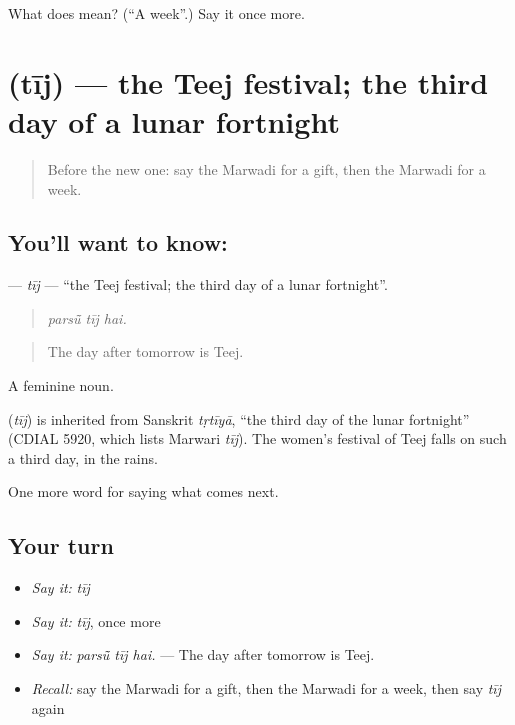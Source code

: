 \begin{tcolorbox}[breakable,colback=teal!4,colframe=teal!35!black,title={Before you move on}]
What does  mean? (\textquotedblleft{}A week\textquotedblright{}.) Say it once more.
\end{tcolorbox}
\section[\texorpdfstring{\mw{तीज} (tīj)}{तीज (tīj)}]{ (tīj) — the Teej festival; the third day of a lunar fortnight}

\label{lesson:MW-C219-tij}



\begin{quote}
Before the new one: say the Marwadi for a gift, then the Marwadi for a week.
\end{quote}

\subsection*{You'll want to know: }
\textbf{} — \emph{tīj} — \textquotedblleft{}the Teej festival; the third day of a lunar fortnight\textquotedblright{}.

\begin{quote}
  
\end{quote}

\begin{quote}
\emph{parsū̃ tīj hai.}
\end{quote}

\begin{quote}
The day after tomorrow is Teej.
\end{quote}

A feminine noun.

\begin{cousinweb}
\textbf{} (\emph{tīj}) is inherited from Sanskrit \emph{tṛtīyā}, \textquotedblleft{}the third day of the lunar fortnight\textquotedblright{} (CDIAL 5920, which lists Marwari \emph{tīj}). The women's festival of Teej falls on such a third day, in the rains.
\end{cousinweb}

\begin{grammarlens}[title={What you've built}]
One more word for saying what comes next.
\end{grammarlens}

\subsection*{Your turn}
\begin{itemize}
\raggedright
  \item \emph{Say it:} \emph{tīj}
  \item \emph{Say it:} \emph{tīj}, once more
  \item \emph{Say it:} \emph{parsū̃ tīj hai.} — The day after tomorrow is Teej.
  \item \emph{Recall:} say the Marwadi for a gift, then the Marwadi for a week, then say \emph{tīj} again
\end{itemize}

